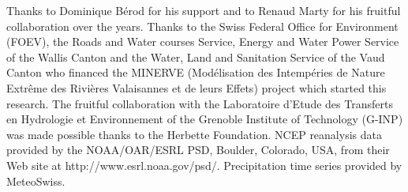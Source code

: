 \documentclass[hess]{copernicus}
\begin{document}
\begin{acknowledgements}
Thanks to Dominique B\'{e}rod for his support and to Renaud Marty for his fruitful collaboration over the years. Thanks to the Swiss Federal Office for Environment (FOEV), the Roads and Water courses Service, Energy and Water Power Service of the Wallis Canton and the Water, Land and Sanitation Service of the Vaud Canton who financed the MINERVE (Mod\'{e}lisation des Intemp\'{e}ries de Nature Extr\^{e}me des Rivi\`{e}res Valaisannes et de leurs Effets) project which started this research. The fruitful collaboration with the Laboratoire d'Etude des Transferts en Hydrologie et Environnement of the Grenoble Institute of Technology (G-INP) was made possible thanks to the Herbette Foundation. NCEP reanalysis data provided by the NOAA/OAR/ESRL PSD, Boulder, Colorado, USA, from their Web site at http://www.esrl.noaa.gov/psd/. Precipitation time series provided by MeteoSwiss. 
\end{acknowledgements}













\end{document}
